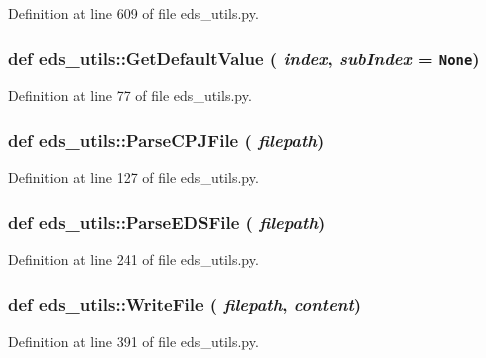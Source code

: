 Definition at line 609 of file eds\_\-utils.py.\hypertarget{namespaceeds__utils_0b06caabd41984790859ebfc43cde92e}{
\subsubsection[GetDefaultValue]{\setlength{\rightskip}{0pt plus 5cm}def eds\_\-utils::Get\-Default\-Value ( {\em index},  {\em sub\-Index} = {\tt None})}}
\label{namespaceeds__utils_0b06caabd41984790859ebfc43cde92e}




Definition at line 77 of file eds\_\-utils.py.\hypertarget{namespaceeds__utils_b8868ba2aa41bd47b62a8cde2962833c}{
\subsubsection[ParseCPJFile]{\setlength{\rightskip}{0pt plus 5cm}def eds\_\-utils::Parse\-CPJFile ( {\em filepath})}}
\label{namespaceeds__utils_b8868ba2aa41bd47b62a8cde2962833c}




Definition at line 127 of file eds\_\-utils.py.\hypertarget{namespaceeds__utils_5e20b6c101dcf976b8fedf20d9e1b739}{
\subsubsection[ParseEDSFile]{\setlength{\rightskip}{0pt plus 5cm}def eds\_\-utils::Parse\-EDSFile ( {\em filepath})}}
\label{namespaceeds__utils_5e20b6c101dcf976b8fedf20d9e1b739}




Definition at line 241 of file eds\_\-utils.py.\hypertarget{namespaceeds__utils_d9540832adbe476f1ba6a0cafcbbafbc}{
\subsubsection[WriteFile]{\setlength{\rightskip}{0pt plus 5cm}def eds\_\-utils::Write\-File ( {\em filepath},  {\em content})}}
\label{namespaceeds__utils_d9540832adbe476f1ba6a0cafcbbafbc}




Definition at line 391 of file eds\_\-utils.py.